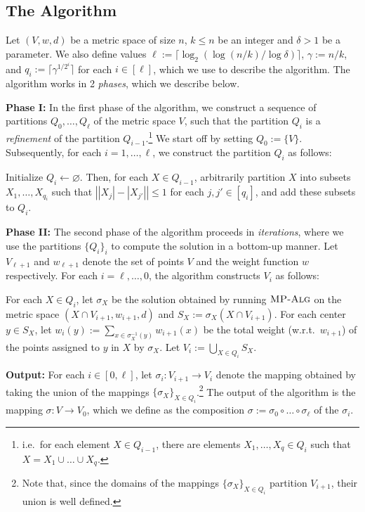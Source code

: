 \documentclass[11pt]{article}
\newenvironment{wrapper}[1]
{
\begin{center}
		\begin{minipage}{\linewidth}
			\begin{mdframed}[hidealllines=true, backgroundcolor=gray!20, leftmargin=0cm,innerleftmargin=0.4cm,innerrightmargin=0.4cm,innertopmargin=0.4cm,innerbottommargin=0.4cm,roundcorner=0pt]
				#1}
			{\end{mdframed}
		\end{minipage}
	\end{center}
}
\newcommand{\1}{\mathmybb{1}}
\newcommand{\MPAlg}{\textnormal{\textsc{MP-Alg}}}
\begin{document}
\subsection{The Algorithm}

Let $(V, w, d)$ be a metric space of size $n$, $k \leq n$ be an integer and $\delta > 1$ be a parameter.
We also define values $\ell := \lceil \log_2(\log(n/k)/\log \delta) \rceil$, $\gamma := n/k$, and $q_i := \lceil \gamma^{1/2^{i}} \rceil$ for each $i \in [\ell]$, which we use to describe the algorithm.
The algorithm works in 2 \emph{phases}, which we describe below.

\medskip
\noindent
\textbf{Phase I:} In the first phase of the algorithm, we construct a sequence of partitions $Q_0,\dots, Q_\ell$ of the metric space $V$, such that the partition $Q_i$ is a \emph{refinement} of the partition $Q_{i-1}$.\footnote{i.e.~for each element $X \in Q_{i-1}$, there are elements $X_1,\dots, X_q \in Q_i$ such that $X=X_1\cup \dots \cup X_q$.} We start off by setting $Q_0 := \{V\}$. Subsequently, for each $i = 1,\dots,\ell$, we construct the partition $Q_i$ as follows:

\begin{wrapper}
    Initialize $Q_i \leftarrow \varnothing$. Then, for each $X \in Q_{i-1}$, arbitrarily partition $X$ into subsets $X_1, \dots, X_{q_i}$ such that $\left||X_{j}| - |X_{j'}|\right| \leq 1$ for each $j,j' \in [q_i]$, and add these subsets to $Q_i$.
\end{wrapper}

\medskip
\noindent
\textbf{Phase II:}
The second phase of the algorithm proceeds in \emph{iterations}, where we use the partitions $\{Q_i\}_i$ to compute the solution in a bottom-up manner.
Let $V_{\ell + 1}$ and $w_{\ell + 1}$ denote the set of points $V$ and the weight function $w$ respectively.
For each $i = \ell ,\dots, 0$, the algorithm constructs $V_i$ as follows:

\begin{wrapper}
    For each $X \in Q_i$, let $\sigma_X$ be the solution obtained by running $\MPAlg$ on the metric space $(X \cap V_{i+1},w_{i+1},d)$ and $S_X := \sigma_X(X \cap V_{i+1})$. For each center $y \in S_X$, let $w_i(y) := \sum_{x \in \sigma_{X}^{-1}(y)} w_{i+1}(x)$ be the total weight (w.r.t.~$w_{i+1}$) of the points assigned to $y$ in $X$ by $\sigma_X$. Let $V_i := \bigcup_{X \in Q_i} S_X$.
\end{wrapper}

\medskip
\noindent
\textbf{Output:}
For each $i \in [0, \ell]$, let $\sigma_i : V_{i+1} \longrightarrow V_i$ denote the mapping obtained by taking the union of the mappings $\{\sigma_X\}_{X \in Q_i}$.\footnote{Note that, since the domains of the mappings $\{\sigma_X\}_{X \in Q_i}$ partition $V_{i+1}$, their union is well defined.}
The output of the algorithm is the mapping $\sigma : V \longrightarrow V_0$, which we define as the composition
$\sigma := \sigma_{0} \circ \dots \circ \sigma_{\ell}$ of the $\sigma_i$.
\end{document}
